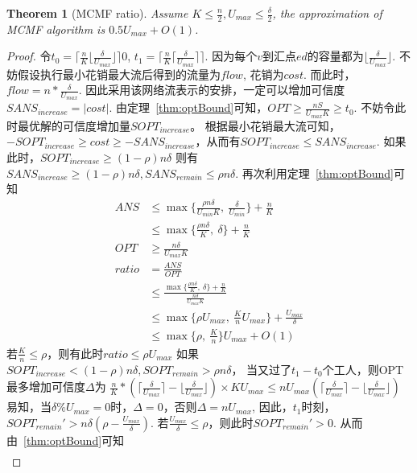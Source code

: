 \documentclass[UTF8]{ctexart}
\newtheorem{theorem}{Theorem} %
\begin{document}
\begin{enumerate}[(1)]
	\newpage
	\begin{theorem}[MCMF ratio]
	Assume $K \le \frac{n}{2}, U_{max} \le \frac{\delta}{2}$, the approximation of MCMF algorithm is $0.5U_{max} + O(1)$.
	\end{theorem}
	\begin{proof}
	令$t_0 = \lceil \frac{n}{K} \lfloor \frac{\delta}{U_{max}} \rfloor \rceil0$,
	$t_1 = \lceil \frac{n}{K} \lceil \frac{\delta}{U_{max}} \rceil \rceil$.
	因为每个$v$到汇点$ed$的容量都为$\lfloor \frac{\delta}{U_{max}} \rfloor$. 
	不妨假设执行最小花销最大流后得到的流量为$flow$, 花销为$cost$.
	而此时，$flow = n * \frac{\delta}{U_{max}}$.
	因此采用该网络流表示的安排，一定可以增加可信度$SANS_{increase} = |cost|$.
	由定理~\ref{thm:optBound}可知，$OPT \ge \frac{nS}{U_{max}K} \ge t_0$.
	不妨令此时最优解的可信度增加量$SOPT_{increase}$。
	根据最小花销最大流可知，$-SOPT_{increase} \ge cost \ge -SANS_{increase}$，从而有$SOPT_{increase} \le SANS_{increase}$.
	如果此时，$SOPT_{increase} \ge (1-\rho) n\delta$
	则有$SANS_{increase} \ge  (1-\rho) n\delta, SANS_{remain} \le  \rho n\delta$.
	再次利用定理~\ref{thm:optBound}可知
	\begin{align*}
		ANS &\le \max \{ \frac{\rho n\delta}{U_{min}K},\ \frac{\delta}{U_{min}} \} + \frac{n}{K} \\
			&\le \max \{ \frac{\rho n\delta}{K},\ \delta \} + \frac{n}{K} \\
		OPT &\ge \frac{n\delta}{U_{max}K} \\
		ratio &= \frac{ANS}{OPT} \\
			  &\le \frac{\max \{ \frac{\rho n\delta}{K},\ \delta \} + \frac{n}{K}}{\frac{n\delta}{U_{max}K}} \\
			  &\le \max \{ \rho U_{max},\ \frac{K}{n}U_{max} \} + \frac{U_{max}}{\delta} \\ 
			  &\le \max \{ \rho,\ \frac{K}{n} \} U_{max} + O(1)
 	\end{align*}
	若$\frac{K}{n} \le \rho$，则有此时$ratio \le \rho U_{max}$
	如果$SOPT_{increase} < (1-\rho) n\delta, SOPT_{remain} >  \rho n\delta$，
	当又过了$t_1 - t_0$个工人，则OPT最多增加可信度$\Delta$为
	$\frac{n}{K} * (\lceil \frac{\delta}{U_{max}} \rceil - \lfloor \frac{\delta}{U_{max}} \rfloor) \times KU_{max} \le nU_{max} (\lceil \frac{\delta}{U_{max}} \rceil - \lfloor \frac{\delta}{U_{max}} \rfloor)$
	易知，当$\delta\%U_{max} = 0$时，$\Delta = 0$，否则$\Delta = nU_{max}$,
	因此，$t_1$时刻，$SOPT_{remain}' > n\delta(\rho - \frac{U_{max}}{\delta})$.
	若$\frac{U_{max}}{\delta} \le \rho$，则此时$SOPT_{remain}' > 0$.
	从而由~\ref{thm:optBound}可知
	\begin{align*}

\end{align*}
\end{proof}
\end{enumerate}
\end{document}
